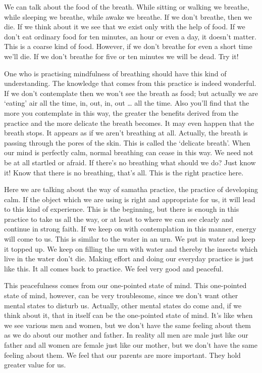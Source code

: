 We can talk about the food of the breath. While sitting or walking we breathe, while sleeping we breathe, while awake we breathe. If we don't breathe, then we die. If we think about it we see that we exist only with the help of food. If we don't eat ordinary food for ten minutes, an hour or even a day, it doesn't matter. This is a coarse kind of food. However, if we don't breathe for even a short time we'll die. If we don't breathe for five or ten minutes we will be dead. Try it!

One who is practising mindfulness of breathing should have this kind of understanding. The knowledge that comes from this practice is indeed wonderful. If we don't contemplate then we won't see the breath as food; but actually we are `eating' air all the time, in, out, in, out \ldots{} all the time. Also you'll find that the more you contemplate in this way, the greater the benefits derived from the practice and the more delicate the breath becomes. It may even happen that the breath stops. It appears as if we aren't breathing at all. Actually, the breath is passing through the pores of the skin. This is called the `delicate breath'. When our mind is perfectly calm, normal breathing can cease in this way. We need not be at all startled or afraid. If there's no breathing what should we do? Just know it! Know that there is no breathing, that's all. This is the right practice here.

Here we are talking about the way of samatha practice, the practice of developing calm. If the object which we are using is right and appropriate for us, it will lead to this kind of experience. This is the beginning, but there is enough in this practice to take us all the way, or at least to where we can see clearly and continue in strong faith. If we keep on with contemplation in this manner, energy will come to us. This is similar to the water in an urn. We put in water and keep it topped up. We keep on filling the urn with water and thereby the insects which live in the water don't die. Making effort and doing our everyday practice is just like this. It all comes back to practice. We feel very good and peaceful.

This peacefulness comes from our one-pointed state of mind. This one-pointed state of mind, however, can be very troublesome, since we don't want other mental states to disturb us. Actually, other mental states do come and, if we think about it, that in itself can be the one-pointed state of mind. It's like when we see various men and women, but we don't have the same feeling about them as we do about our mother and father. In reality all men are male just like our father and all women are female just like our mother, but we don't have the same feeling about them. We feel that our parents are more important. They hold greater value for us.

